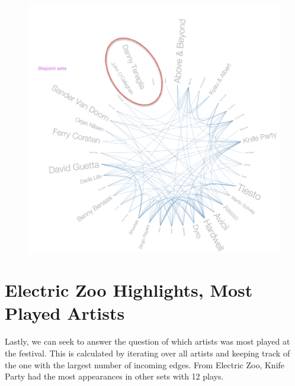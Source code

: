 \documentclass[12pt]{dalcsthesis}
\begin{document}
\begin{figure}[h]
\includegraphics[scale=.5]{disjoint_sets}
\centering
\end{figure}

\section{Electric Zoo Highlights, Most Played Artists}

Lastly, we can seek to answer the question of which artists was most played at the festival. This is calculated by iterating over all artists and keeping track of the one with the largest number of incoming edges. From Electric Zoo, Knife Party had the most appearances in other sets with 12 plays.  \newpage
\end{document}
